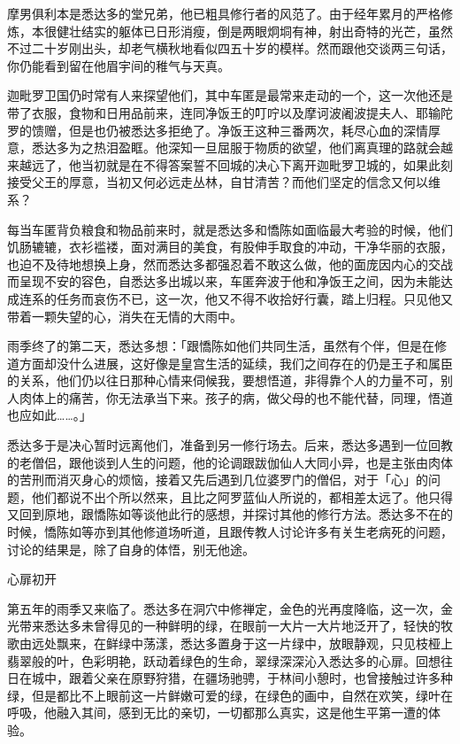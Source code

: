 \documentclass[12pt,twoside,openany]{book}
\begin{document}
摩男俱利本是悉达多的堂兄弟，他已粗具修行者的风范了。由于经年累月的严格修炼，本很健壮结实的躯体已日形消瘦，倒是两眼炯垌有神，射出奇特的光芒，虽然不过二十岁刚出头，却老气横秋地看似四五十岁的模样。然而跟他交谈两三句话，你仍能看到留在他眉宇间的稚气与天真。

迦毗罗卫国仍时常有人来探望他们，其中车匿是最常来走动的一个，这一次他还是带了衣服，食物和日用品前来，连同净饭王的叮咛以及摩诃波阇波提夫人、耶输陀罗的馈赠，但是也仍被悉达多拒绝了。净饭王这种三番两次，耗尽心血的深情厚意，悉达多为之热泪盈眶。他深知一旦屈服于物质的欲望，他们离真理的路就会越来越远了，他当初就是在不得答案誓不回城的决心下离开迦毗罗卫城的，如果此刻接受父王的厚意，当初又何必远走丛林，自甘清苦？而他们坚定的信念又何以维系？

每当车匿背负粮食和物品前来时，就是悉达多和憍陈如面临最大考验的时候，他们饥肠辘辘，衣衫褴褛，面对满目的美食，有股伸手取食的冲动，干净华丽的衣服，也迫不及待地想换上身，然而悉达多都强忍着不敢这么做，他的面庞因内心的交战而呈现不安的容色，自悉达多出城以来，车匿奔波于他和净饭王之间，因为未能达成连系的任务而哀伤不已，这一次，他又不得不收拾好行囊，踏上归程。只见他又带着一颗失望的心，消失在无情的大雨中。

雨季终了的第二天，悉达多想：「跟憍陈如他们共同生活，虽然有个伴，但是在修道方面却没什么进展，这好像是皇宫生活的延续，我们之间存在的仍是王子和属臣的关系，他们仍以往日那种心情来伺候我，要想悟道，非得靠个人的力量不可，别人肉体上的痛苦，你无法承当下来。孩子的病，做父母的也不能代替，同理，悟道也应如此……。」

悉达多于是决心暂时远离他们，准备到另一修行场去。后来，悉达多遇到一位回教的老僧侣，跟他谈到人生的问题，他的论调跟跋伽仙人大同小异，也是主张由肉体的苦刑而消灭身心的烦恼，接着又先后遇到几位婆罗门的僧侣，对于「心」的问题，他们都说不出个所以然来，且比之阿罗蓝仙人所说的，都相差太远了。他只得又回到原地，跟憍陈如等谈他此行的感想，并探讨其他的修行方法。悉达多不在的时候，憍陈如等亦到其他修道场听道，且跟传教人讨论许多有关生老病死的问题，讨论的结果是，除了自身的体悟，别无他途。

心扉初开

第五年的雨季又来临了。悉达多在洞穴中修禅定，金色的光再度降临，这一次，金光带来悉达多未曾得见的一种鲜明的绿，在眼前一大片一大片地泛开了，轻快的牧歌由远处飘来，在鲜绿中荡漾，悉达多置身于这一片绿中，放眼静观，只见枝桠上翡翠般的叶，色彩明艳，跃动着绿色的生命，翠绿深深沁入悉达多的心扉。回想往日在城中，跟着父亲在原野狩猎，在疆场驰骋，于林间小憩时，也曾接触过许多种绿，但是都比不上眼前这一片鲜嫩可爱的绿，在绿色的画中，自然在欢笑，绿叶在呼吸，他融入其间，感到无比的亲切，一切都那么真实，这是他生平第一遭的体验。
\end{document}
